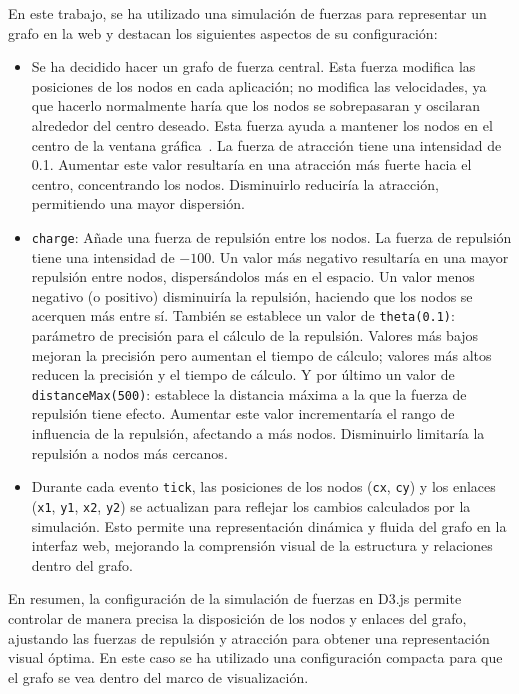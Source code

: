 En este trabajo, se ha utilizado una simulación de fuerzas para representar un grafo en la web y destacan los siguientes aspectos de su configuración:

\begin{itemize}
	\item Se ha decidido hacer un grafo de fuerza central. Esta fuerza modifica las posiciones de los nodos en cada aplicación; no modifica las velocidades, ya que hacerlo normalmente haría que los nodos se sobrepasaran y oscilaran alrededor del centro deseado. Esta fuerza ayuda a mantener los nodos en el centro de la ventana gráfica~\cite{fuerzaCentral}. La fuerza de atracción tiene una intensidad de 0.1. Aumentar este valor resultaría en una atracción más fuerte hacia el centro, concentrando los nodos. Disminuirlo reduciría la atracción, permitiendo una mayor dispersión.
	\item \texttt{charge}: Añade una fuerza de repulsión entre los nodos. La fuerza de repulsión tiene una intensidad de $-100$. Un valor más negativo resultaría en una mayor repulsión entre nodos, dispersándolos más en el espacio. Un valor menos negativo (o positivo) disminuiría la repulsión, haciendo que los nodos se acerquen más entre sí. También se establece un valor de \texttt{theta(0.1)}: parámetro de precisión para el cálculo de la repulsión. Valores más bajos mejoran la precisión pero aumentan el tiempo de cálculo; valores más altos reducen la precisión y el tiempo de cálculo. Y por último un valor de \texttt{distanceMax(500)}: establece la distancia máxima a la que la fuerza de repulsión tiene efecto. Aumentar este valor incrementaría el rango de influencia de la repulsión, afectando a más nodos. Disminuirlo limitaría la repulsión a nodos más cercanos.
	\item Durante cada evento \texttt{tick}, las posiciones de los nodos (\texttt{cx}, \texttt{cy}) y los enlaces (\texttt{x1}, \texttt{y1}, \texttt{x2}, \texttt{y2}) se actualizan para reflejar los cambios calculados por la simulación. Esto permite una representación dinámica y fluida del grafo en la interfaz web, mejorando la comprensión visual de la estructura y relaciones dentro del grafo.
	
\end{itemize}

En resumen, la configuración de la simulación de fuerzas en D3.js permite controlar de manera precisa la disposición de los nodos y enlaces del grafo, ajustando las fuerzas de repulsión y atracción para obtener una representación visual óptima. En este caso se ha utilizado una configuración compacta para que el grafo se vea dentro del marco de visualización.


